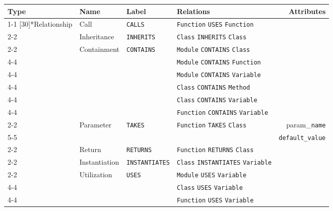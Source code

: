 \begin{tabularx}{\textwidth}{p{1.8cm}llXr}
\toprule
\textbf{Type} & \textbf{Name} & \textbf{Label} & \textbf{Relations} & \textbf{Attributes} \\
\cmidrule{1-1}\cmidrule{2-2}\cmidrule{3-3}\cmidrule{4-4}\cmidrule{5-5}
\multirow{15}[30]{*}{Relationship} & Call & \texttt{CALLS} & \texttt{Function} \texttt{USES} \texttt{Function} &  \\
\cmidrule{2-2}\cmidrule{3-3}\cmidrule{4-4}\cmidrule{5-5}
 & Inheritance & \texttt{INHERITS} & \texttt{Class} \texttt{INHERITS} \texttt{Class} &  \\
\cmidrule{2-2}\cmidrule{3-3}\cmidrule{4-4}\cmidrule{5-5}
 & \multirow{6}[12]{*}{Containment} & \multirow{6}[12]{*}{\texttt{CONTAINS}} & \texttt{Module} \texttt{CONTAINS} \texttt{Class} &  \\
\cmidrule{4-4}\cmidrule{5-5}
 &  &  & \texttt{Module} \texttt{CONTAINS} \texttt{Function} &  \\
\cmidrule{4-4}\cmidrule{5-5}
 &  &  & \texttt{Module} \texttt{CONTAINS} \texttt{Variable} &  \\
\cmidrule{4-4}\cmidrule{5-5}
 &  &  & \texttt{Class} \texttt{CONTAINS} \texttt{Method} &  \\
\cmidrule{4-4}\cmidrule{5-5}
 &  &  & \texttt{Class} \texttt{CONTAINS} \texttt{Variable} &  \\
\cmidrule{4-4}\cmidrule{5-5}
 &  &  & \texttt{Function} \texttt{CONTAINS} \texttt{Variable} &  \\
\cmidrule{2-2}\cmidrule{3-3}\cmidrule{4-4}\cmidrule{5-5}
 & \multirow{2}[4]{*}{Parameter} & \multirow{2}[4]{*}{\texttt{TAKES}} & \multirow{2}[4]{*}{\texttt{Function} \texttt{TAKES} \texttt{Class}} & param\_\texttt{name} \\
\cmidrule{5-5}
 &  &  &  & \texttt{default\_value} \\
\cmidrule{2-2}\cmidrule{3-3}\cmidrule{4-4}\cmidrule{5-5}
 & Return & \texttt{RETURNS} & \texttt{Function} \texttt{RETURNS} \texttt{Class} &  \\
\cmidrule{2-2}\cmidrule{3-3}\cmidrule{4-4}\cmidrule{5-5}
 & Instantiation & \texttt{INSTANTIATES} & \texttt{Class} \texttt{INSTANTIATES} \texttt{Variable} &  \\
\cmidrule{2-2}\cmidrule{3-3}\cmidrule{4-4}\cmidrule{5-5}
 & \multirow{3}[6]{*}{Utilization} & \multirow{3}[6]{*}{\texttt{USES}} & \texttt{Module} \texttt{USES} \texttt{Variable} &  \\
\cmidrule{4-4}\cmidrule{5-5}
 &  &  & \texttt{Class} \texttt{USES} \texttt{Variable} &  \\
\cmidrule{4-4}\cmidrule{5-5}
 &  &  & \texttt{Function} \texttt{USES} \texttt{Variable} &  \\
\bottomrule
\end{tabularx}

